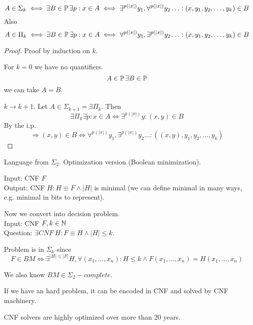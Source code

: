 \begin{consequence}
	\[ A \in \Sigma_k \iff \exists B \in \operatorname{\mathbb{P}} \exists p: x \in A \iff \exists^{p(|x|)} y_1, \forall^{p(|x|)} y_2 \ldots : (x, y_1, y_2, \ldots, y_k) \in B \]
	Also
	\[ A \in \Pi_k \iff \exists B \in \operatorname{\mathbb{P}} \exists p: x \in A \iff \forall^{p(|x|)} y_1, \exists^{p(|x|)} y_2 \ldots : (x, y_1, y_2, \ldots, y_k) \in B \]
\end{consequence}
\begin{proof}
	Proof by induction on $k$.

	For $k = 0$ we have no quantifiers.
	\[ A \in \operatorname{\mathbb{P}} \exists B \in \operatorname{\mathbb{P}} \]
	we can take $A = B$.

	$k \to k + 1$. Let $A \in \Sigma_{k + 1} = \exists \Pi_k$.
	Then
	\[ \exists \Pi_k \exists p: x \in A \iff \exists^{p(|x|)} y: (x,y) \in B \]
	By the i.p.
	\[ \Rightarrow (x,y) \in B \iff \forall^{p(|x|)} y_1, \exists^{p(|x|)} y_2 \ldots : ((x,y), y_1, y_2, \ldots, y_k) \]
\end{proof}

\begin{example}
	Language from $\Sigma_2$.
	Optimization version (Boolean minimization).

	Input: CNF $F$\\
	Output: CNF $H: H \equiv F \land |H|$ is minimal (we can define minimal in many ways, e.g. minimal in bits to represent).

	Now we convert into decision problem.\\
	Input: CNF $F, k \in \operatorname{\mathbb{N}}$ \\
	Question: $\exists CNF\ H: F \equiv H \land |H| \leq k $.

	Problem is in $\Sigma_k$ since
	\[ F \in BM \iff \exists^{|H| \leq |F|} H, \forall (x_1, \ldots, x_n): H \leq k \land F(x_1, \ldots, x_n) = H(x_1, \ldots, x_n) \]

	We also know $BM \in \Sigma_2-complete$.
\end{example}

\begin{note}
	If we have an hard problem, it can be encoded in CNF and solved by CNF machinery.

	CNF solvers are highly optimized over more than 20 years.
\end{note}
